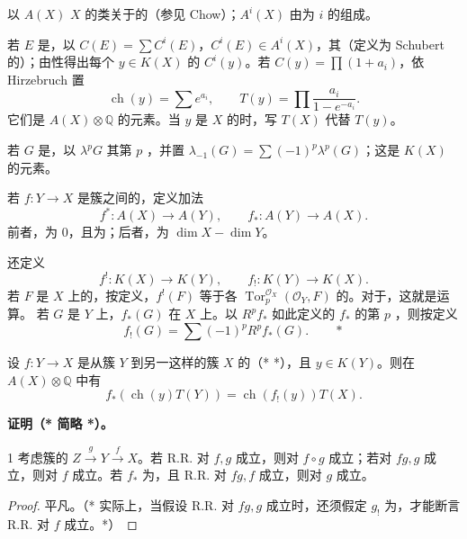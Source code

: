 以 $A(X)$  $X$ 的类关于的（参见 Chow）；$A^i(X)$ 由为 $i$ 的组成。

若 $E$ 是，以 $C(E)=\sum C^i(E)$，$C^i(E)\in A^i(X)$，其（定义为 Schubert 的）；由性得出每个 $y\in K(X)$ 的 $C^i(y)$。若 $C(y)=\prod(1+a_i)$，依 Hirzebruch 置
\[
\operatorname{ch}(y)=\sum e^{a_i},\qquad T(y)=\prod\frac{a_i}{1-e^{-a_i}}.
\]
它们是 $A(X)\otimes\mathbb Q$ 的元素。当 $y$ 是 $X$ 的时，写 $T(X)$ 代替 $T(y)$。

若 $G$ 是，以 $\lambda^pG$ 其第 $p$ ，并置 $\lambda_{-1}(G)=\sum(-1)^p\lambda^p(G)$；这是 $K(X)$ 的元素。

若 $f:Y\to X$ 是簇之间的，定义加法
\[
f^*:A(X)\longrightarrow A(Y),\qquad f_*:A(Y)\longrightarrow A(X).
\]
前者，为 $0$，且为；后者，为 $\dim X-\dim Y$。

还定义
\[
f^!:K(X)\longrightarrow K(Y),\qquad f_!:K(Y)\longrightarrow K(X).
\]
若 $F$ 是 $X$ 上的，按定义，$f^!(F)$ 等于各 $\operatorname{Tor}^{\mathcal O_X}_p(\mathcal O_Y,F)$ 的。对于，这就是运算。
若 $G$ 是 $Y$ 上，$f_*(G)$ 在 $X$ 上。以 $R^pf_*$ 如此定义的 $f_*$ 的第 $p$ ，则按定义
\[
f_!(G)=\sum(-1)^pR^pf_*(G).\qquad *
\]
\begin{SGAresult}{}{}
设 $f:Y\to X$ 是从簇 $Y$ 到另一这样的簇 $X$ 的（*  *），且 $y\in K(Y)$。则在 $A(X)\otimes\mathbb Q$ 中有
\[
f_*(\operatorname{ch}(y)T(Y))=\operatorname{ch}(f_!(y))T(X).\tag{1}
\]
\end{SGAresult}
\textbf{证明（* 简略 *）。}
\begin{SGAresult}{}{1}
考虑簇的 $Z\xrightarrow{g}Y\xrightarrow{f}X$。若 R.R. 对 $f,g$ 成立，则对 $f\circ g$ 成立；若对 $fg,g$ 成立，则对 $f$ 成立。若 $f_*$ 为，且 R.R. 对 $fg,f$ 成立，则对 $g$ 成立。
\end{SGAresult}
\begin{proof}
平凡。（* 实际上，当假设 R.R. 对 $fg,g$ 成立时，还须假定 $g_!$ 为，才能断言 R.R. 对 $f$ 成立。*）
\end{proof}

